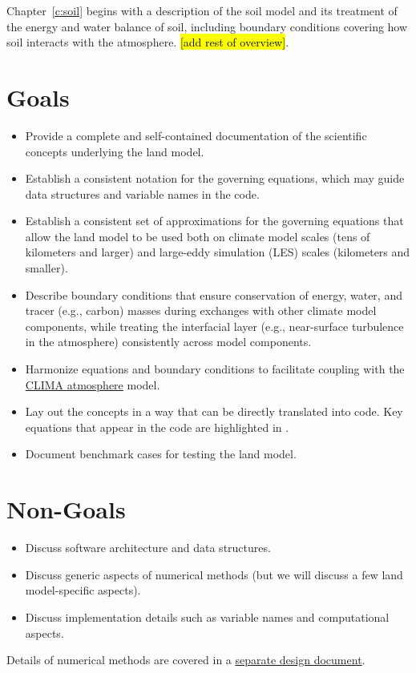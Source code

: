 \documentclass[twoside,10pt]{report}
\begin{document}
Chapter~\ref{c:soil} begins with a description of the soil model and its treatment of the energy and water balance of soil, including boundary conditions covering how soil interacts with the atmosphere. \hl{[add rest of overview]}.

\section{Goals}

\begin{itemize}
    \item Provide a complete and self-contained documentation of the scientific concepts underlying the land model.
    \item Establish a consistent notation for the governing equations, which may guide data structures and variable names in the code.
    \item Establish a consistent set of approximations for the governing equations that allow the land model to be used both on climate model scales (tens of kilometers and larger) and large-eddy simulation (LES) scales (kilometers and smaller).
    \item Describe boundary conditions that ensure conservation of energy, water, and tracer (e.g., carbon) masses during exchanges with other climate model components, while treating the interfacial layer (e.g., near-surface turbulence in the atmosphere) consistently across model components.
    \item Harmonize equations and boundary conditions to facilitate coupling with the \href{https://github.com/climate-machine/Design-Docs/blob/master/CLIMA-atmos/}{CLIMA atmosphere} model.
    \item Lay out the concepts in a way that can be directly translated into code. Key equations that appear in the code are highlighted in .
    \item Document benchmark cases for testing the land model.
\end{itemize}

\section{Non-Goals}

\begin{itemize}
    \item Discuss software architecture and data structures.
    \item Discuss generic aspects of numerical methods (but we will discuss a few land model-specific aspects).
    \item Discuss implementation details such as variable names and computational aspects.
\end{itemize}
Details of numerical methods are covered in a \href{https://github.com/climate-machine/Design-Docs/tree/master/CLIMA-numerics}{separate design document}.
\end{document}
